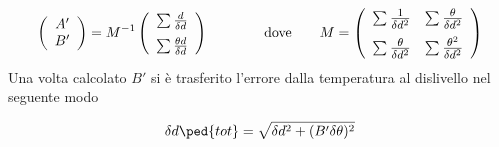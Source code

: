 \begin{equation}
    \left(
    \begin{array}{c}
        A' \\
        B'
    \end{array} 
    \right)
    =
    M^{-1}
    \left(
    \begin{array}{c}
        \sum \frac{d}{\delta d} \\[2mm]
        \sum \frac{\theta d}{\delta d}
    \end{array} 
    \right)
    \qquad \qquad
    \text{dove}
    \qquad
    M =
    \large
    \left(
    \begin{array}{c c}
        \sum \frac{1}{\delta d^2} & \sum \frac{\theta}{\delta d^2} \\[2mm]
        \sum \frac{\theta}{\delta d^2} & \sum \frac{\theta^2}{\delta d^2}
    \end{array} 
    \right)
    \label{eq:min_quad}
\end{equation}
%
Una volta calcolato $B'$ si è trasferito l'errore dalla temperatura al dislivello nel seguente modo

\begin{equation}
    \delta d\ped{tot} = \sqrt{\delta d^2 + (B'\delta \theta)^2}
\end{equation}
